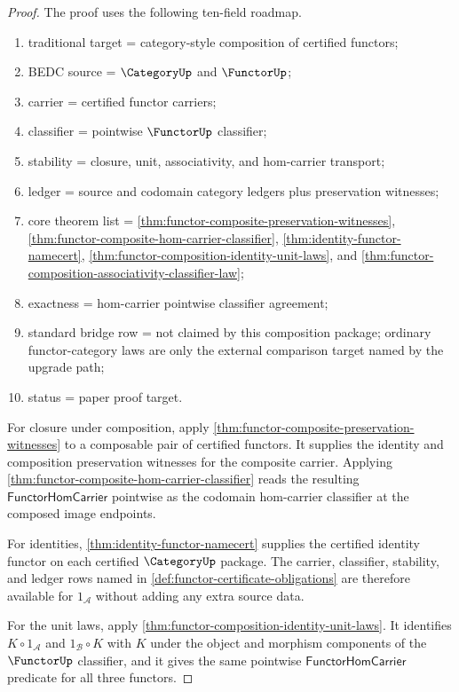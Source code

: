 \begin{proof}
The proof uses the following ten-field roadmap.
\begin{enumerate}
\item traditional target = category-style composition of certified functors;
\item BEDC source = $\CategoryUp$ and $\FunctorUp$;
\item carrier = certified functor carriers;
\item classifier = pointwise $\FunctorUp$ classifier;
\item stability = closure, unit, associativity, and hom-carrier transport;
\item ledger = source and codomain category ledgers plus preservation witnesses;
\item core theorem list = \autoref{thm:functor-composite-preservation-witnesses},
\autoref{thm:functor-composite-hom-carrier-classifier},
\autoref{thm:identity-functor-namecert},
\autoref{thm:functor-composition-identity-unit-laws}, and
\autoref{thm:functor-composition-associativity-classifier-law};
\item exactness = hom-carrier pointwise classifier agreement;
\item standard bridge row = not claimed by this composition package; ordinary
functor-category laws are only the external comparison target named by the
upgrade path;
\item status = paper proof target.
\end{enumerate}

For closure under composition, apply
\autoref{thm:functor-composite-preservation-witnesses} to a composable pair
of certified functors. It supplies the identity and composition preservation
witnesses for the composite carrier. Applying
\autoref{thm:functor-composite-hom-carrier-classifier} reads the resulting
$\mathsf{FunctorHomCarrier}$ pointwise as the codomain hom-carrier classifier
at the composed image endpoints.

For identities, \autoref{thm:identity-functor-namecert} supplies the certified
identity functor on each certified $\CategoryUp$ package. The carrier,
classifier, stability, and ledger rows named in
\autoref{def:functor-certificate-obligations} are therefore available for
$1_{\mathcal A}$ without adding any extra source data.

For the unit laws, apply
\autoref{thm:functor-composition-identity-unit-laws}. It identifies
$K\circ 1_{\mathcal A}$ and $1_{\mathcal B}\circ K$ with $K$ under the
object and morphism components of the $\FunctorUp$ classifier, and it gives
the same pointwise $\mathsf{FunctorHomCarrier}$ predicate for all three
functors.


\end{proof}
